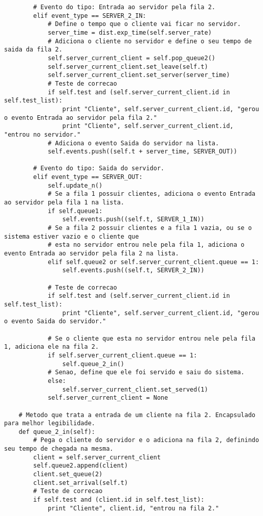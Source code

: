 \begin{lstlisting}
        # Evento do tipo: Entrada ao servidor pela fila 2.
        elif event_type == SERVER_2_IN:
            # Define o tempo que o cliente vai ficar no servidor.        
            server_time = dist.exp_time(self.server_rate)
            # Adiciona o cliente no servidor e define o seu tempo de saida da fila 2.
            self.server_current_client = self.pop_queue2()
            self.server_current_client.set_leave(self.t)
            self.server_current_client.set_server(server_time)
            # Teste de correcao
            if self.test and (self.server_current_client.id in self.test_list):
                print "Cliente", self.server_current_client.id, "gerou o evento Entrada ao servidor pela fila 2."
                print "Cliente", self.server_current_client.id, "entrou no servidor."
            # Adiciona o evento Saida do servidor na lista.
            self.events.push((self.t + server_time, SERVER_OUT))                

        # Evento do tipo: Saida do servidor.
        elif event_type == SERVER_OUT:
            self.update_n()
            # Se a fila 1 possuir clientes, adiciona o evento Entrada ao servidor pela fila 1 na lista.
            if self.queue1:
                self.events.push((self.t, SERVER_1_IN))
            # Se a fila 2 possuir clientes e a fila 1 vazia, ou se o sistema estiver vazio e o cliente que
            # esta no servidor entrou nele pela fila 1, adiciona o evento Entrada ao servidor pela fila 2 na lista.
            elif self.queue2 or self.server_current_client.queue == 1:
                self.events.push((self.t, SERVER_2_IN))
            
            # Teste de correcao
            if self.test and (self.server_current_client.id in self.test_list):
                print "Cliente", self.server_current_client.id, "gerou o evento Saida do servidor."
            
            # Se o cliente que esta no servidor entrou nele pela fila 1, adiciona ele na fila 2.
            if self.server_current_client.queue == 1:
                self.queue_2_in()
            # Senao, define que ele foi servido e saiu do sistema.
            else:
                self.server_current_client.set_served(1)
            self.server_current_client = None

    # Metodo que trata a entrada de um cliente na fila 2. Encapsulado para melhor legibilidade.
    def queue_2_in(self):
        # Pega o cliente do servidor e o adiciona na fila 2, definindo seu tempo de chegada na mesma.
        client = self.server_current_client
        self.queue2.append(client)
        client.set_queue(2)
        client.set_arrival(self.t)
        # Teste de correcao
        if self.test and (client.id in self.test_list):
            print "Cliente", client.id, "entrou na fila 2."


\end{lstlisting}
